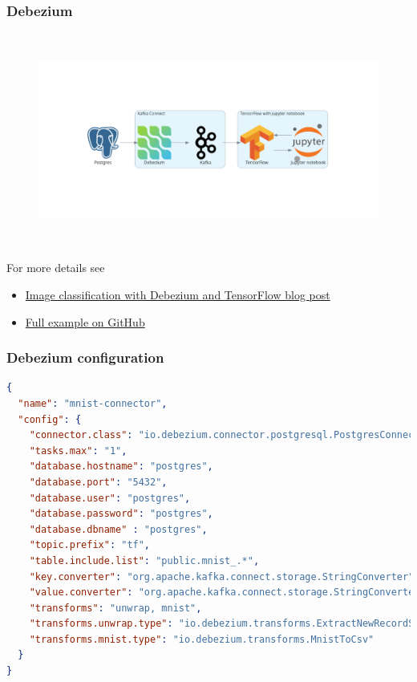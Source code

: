 \documentclass[10pt,utf8]{beamer}
\begin{document}
\begin{frame}
    \frametitle{Debezium}
    \vspace*{-3cm}
    \begin{figure}
        \hspace*{-1.4cm}
        \includegraphics[height=7cm]{./img/postgres_to_tf.eps}
    \end{figure}
    
    For more details see
    \begin{itemize}
        \color{blue}
        \item \href{https://debezium.io/blog/2023/05/02/tensorflow-mnist-classification}{Image classification with Debezium and TensorFlow blog post}
        \item \href{https://github.com/debezium/debezium-examples/tree/main/machine-learning/tensorflow-mnist}{Full example on GitHub}
        \color{black}
    \end{itemize}
\end{frame}


\begin{frame}[fragile]
    \frametitle{Debezium configuration}
    \footnotesize
    \begin{lstlisting}[language=json]
{
  "name": "mnist-connector",
  "config": {
    "connector.class": "io.debezium.connector.postgresql.PostgresConnector",
    "tasks.max": "1",
    "database.hostname": "postgres",
    "database.port": "5432",
    "database.user": "postgres",
    "database.password": "postgres",
    "database.dbname" : "postgres",
    "topic.prefix": "tf",
    "table.include.list": "public.mnist_.*",
    "key.converter": "org.apache.kafka.connect.storage.StringConverter",
    "value.converter": "org.apache.kafka.connect.storage.StringConverter",
    "transforms": "unwrap, mnist",
    "transforms.unwrap.type": "io.debezium.transforms.ExtractNewRecordState",
    "transforms.mnist.type": "io.debezium.transforms.MnistToCsv"
  }
} 
     \end{lstlisting}
\end{frame}
\end{document}
